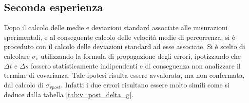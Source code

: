 \documentclass[a4paper,11pt,oneside]{article}
\begin{document}
\subsection{Seconda esperienza}
Dopo il calcolo delle medie e deviazioni standard associate alle misurazioni sperimentali, e al conseguente calcolo delle velocità medie di percorrenza, si è proceduto con il calcolo delle deviazioni standard ad esse associate. Si è scelto di calcolare $\sigma_{v}$ utilizzando la formula di propagazione degli errori, ipotizzando che $\Delta t$ e $\Delta s$ fossero statisticamente indipendenti e di conseguenza non analizzare il termine di covarianza. Tale ipotesi risulta essere avvalorata, ma non confermata, dal calcolo di $\sigma_{v post}$. Infatti i due errori risultano essere molto simili come si deduce dalla tabella \ref{tab:v_post_delta_g}.
\end{document}
